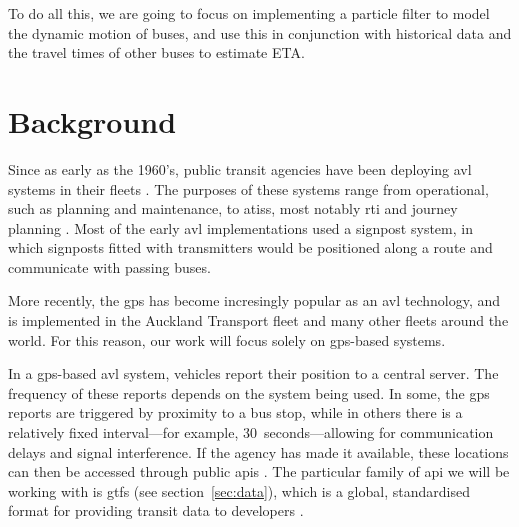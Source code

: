 \documentclass[12pt,a4paper]{article}
\begin{document}
To do all this, we are going to focus on implementing a particle filter to model the dynamic motion of buses,
and use this in conjunction with historical data and the travel times of other buses to estimate ETA.



\section{Background}
\label{sec:background}







Since as early as the 1960's, public transit agencies have been deploying \gls{avl} systems
in their fleets \citep{tcrp:1997}.
The purposes of these systems range from operational, such as planning and maintenance, 
to \glspl{atis}, most notably \gls{rti} and journey planning \citep{tcrp:2003}.
Most of the early \gls{avl} implementations used a signpost system,
in which signposts fitted with transmitters would be positioned along a route
and communicate with passing buses.

More recently, the \gls{gps} has become incresingly popular as an \gls{avl} technology,
and is implemented in the Auckland Transport fleet
and many other fleets around the world.
For this reason, our work will focus solely on \gls{gps}-based systems.


In a \gls{gps}-based \gls{avl} system, vehicles report their position to a central server.
The frequency of these reports depends on the system being used.
In some, the \gls{gps} reports are triggered by proximity to a bus stop,
while in others there is a relatively fixed interval---for example, 30~seconds---allowing
for communication delays and signal interference.
If the agency has made it available, 
these locations can then be accessed through public \glspl{api}
\citep{tcrp:2003}.
The particular family of \gls{api} we will be working with is \gls{gtfs}
(see section~\ref{sec:data}),
which is a global, standardised format for providing transit data to developers
\citep{gtfs}.
\end{document}
